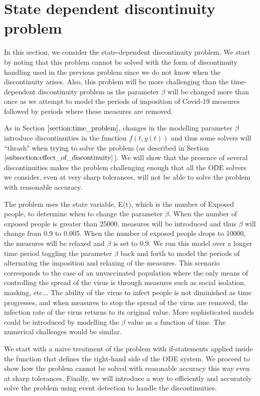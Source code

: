 
\section{State dependent discontinuity problem}
In this section, we consider the state-dependent discontinuity problem. We start by noting that this problem cannot be solved with the form of discontinuity handling used in the previous problem since we do not know when the discontinuity arises. Also, this problem will be more challenging than the time-dependent discontinuity problem as the parameter $\beta$ will be changed more than once as we attempt to model the periods of imposition of Covid-19 measures followed by periods where these measures are removed. 

As in Section $\ref{section:time_problem}$, changes in the modelling parameter $\beta$ introduce discontinuities in the function $f(t, y(t))$ and thus some solvers will ``thrash" when trying to solve the problem (as described in Section $\ref{subsection:effect_of_discontinuity}$). We will show that the presence of several discontinuities makes the problem challenging enough that all the ODE solvers we consider, even at very sharp tolerances, will not be able to solve the problem with reasonable accuracy.

The problem uses the state variable, E(t), which is the number of Exposed people, to determine when to change the parameter $\beta$. When the number of exposed people is greater than 25000, measures will be introduced and thus $\beta$ will change from 0.9 to 0.005. When the number of exposed people drops to 10000, the measures will be relaxed and $\beta$ is set to 0.9. We run this model over a longer time period toggling the parameter $\beta$ back and forth to model the periods of alternating the imposition and relaxing of the measures. This scenario corresponds to the case of an unvaccinated population where the only means of controlling the spread of the virus is through measures such as social isolation, masking, etc... The ability of the virus to infect people is not diminished as time progresses, and when measures to stop the spread of the virus are removed, the infection rate of the virus returns to its original value. More sophisticated models could be introduced by modelling the $\beta$ value as a function of time. The numerical challenges would be similar.

We start with a naive treatment of the problem with if-statements applied inside the function that defines the right-hand side of the ODE system. We proceed to show how the problem cannot be solved with reasonable accuracy this way even at sharp tolerances. Finally, we will introduce a way to efficiently and accurately solve the problem using event detection to handle the discontinuities.

